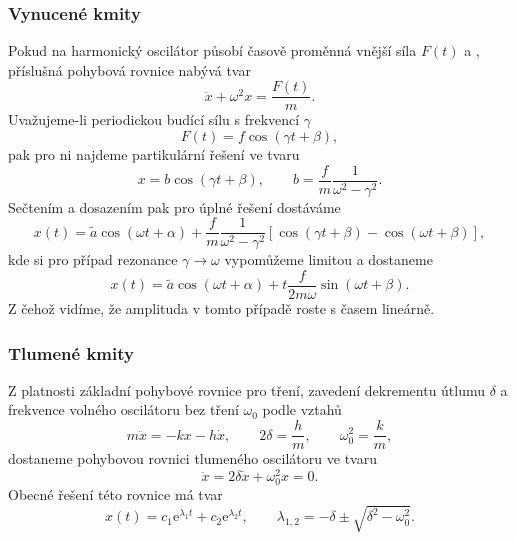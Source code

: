 \documentclass[english]{article}
\begin{document}
	\subsubsection{Vynucené kmity}
		Pokud na harmonický oscilátor působí časově proměnná vnější síla $F(t)$ a , příslušná pohybová rovnice nabývá tvar
		\begin{equation}
		\ddot{x} + \omega^2 x = \frac{F(t)}{m}.
		\end{equation}
		Uvažujeme-li periodickou budící sílu s frekvencí $\gamma$
		\begin{equation}
		F(t) = f \cos(\gamma t + \beta),
		\end{equation}
		pak pro ni najdeme partikulární řešení ve tvaru 
		\begin{equation}
		x = b \cos(\gamma t + \beta), \qquad b = \frac{f}{m}\frac{1}{\omega^2 - \gamma^2}.
		\end{equation}
		Sečtením a dosazením pak pro úplné řešení dostáváme 
		\begin{equation}
		x(t) = \tilde{a} \cos(\omega t + \alpha) + \frac{f}{m}\frac{1}{\omega^2 - \gamma^2} \left[ \cos( \gamma t + \beta ) - \cos( \omega t + \beta ) \right],
		\end{equation}
		kde si pro případ rezonance $ \gamma \rightarrow \omega$ vypomůžeme limitou a dostaneme
		\begin{equation}
		x(t) = \tilde{a} \cos(\omega t + \alpha) + t\frac{f}{2 m \omega} \sin( \omega t + \beta ).
		\end{equation}
		Z čehož vidíme, že amplituda v tomto případě roste s časem lineárně.
\fi		
		\subsubsection{Tlumené kmity}
		Z platnosti základní pohybové rovnice pro tření, zavedení dekrementu útlumu $\delta$ a frekvence volného oscilátoru bez tření $\omega_0$ podle vztahů
		\begin{equation}
		m \ddot{x} = -kx - h \dot{x}, \qquad 2\delta = \frac{h}{m}, \qquad \omega_0^2 = \frac{k}{m},
		\end{equation}
		dostaneme pohybovou rovnici tlumeného oscilátoru ve tvaru
		\begin{equation} \label{eq:pohyb_rovnice_tlumene_kmity}
		\ddot{x} = 2 \delta \dot{x} + \omega_0^2 x = 0.
		\end{equation}	
		Obecné řešení této rovnice má tvar
		\begin{equation}
		x(t) = c_1 \mathrm{e}^{\lambda_1 t}  + c_2 \mathrm{e}^{\lambda_2 t}, \qquad \lambda_{1,2} = - \delta \pm \sqrt{\delta^2 - \omega_0^2}.
		\end{equation}
		
\end{document}

